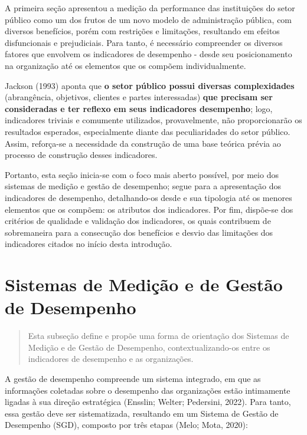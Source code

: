 \documentclass[
  letterpaper,
  DIV=11,
  numbers=noendperiod]{scrreprt}
\begin{document}
A primeira seção apresentou a medição da performance das instituições do
setor público como um dos frutos de um novo modelo de administração
pública, com diversos benefícios, porém com restrições e limitações,
resultando em efeitos disfuncionais e prejudiciais. Para tanto, é
necessário compreender os diversos fatores que envolvem os indicadores
de desempenho - desde seu posicionamento na organização até os elementos
que os compõem individualmente.

Jackson (1993) aponta que \textbf{o setor público possui diversas
complexidades} (abrangência, objetivos, clientes e partes interessadas)
\textbf{que precisam ser consideradas e ter reflexo em seus indicadores
desempenho}; logo, indicadores triviais e comumente utilizados,
provavelmente, não proporcionarão os resultados esperados, especialmente
diante das peculiaridades do setor público. Assim, reforça-se a
necessidade da construção de uma base teórica prévia ao processo de
construção desses indicadores.

Portanto, esta seção inicia-se com o foco mais aberto possível, por meio
dos sistemas de medição e gestão de desempenho; segue para a
apresentação dos indicadores de desempenho, detalhando-os desde e sua
tipologia até os menores elementos que os compõem: os atributos dos
indicadores. Por fim, dispõe-se dos critérios de qualidade e validação
dos indicadores, os quais contribuem de sobremaneira para a consecução
dos benefícios e desvio das limitações dos indicadores citados no início
desta introdução.

\hypertarget{sistemas-de-mediuxe7uxe3o-e-de-gestuxe3o-de-desempenho}{%
\chapter{Sistemas de Medição e de Gestão de
Desempenho}\label{sistemas-de-mediuxe7uxe3o-e-de-gestuxe3o-de-desempenho}}

\begin{quote}
Esta subseção define e propõe uma forma de orientação dos Sistemas de
Medição e de Gestão de Desempenho, contextualizando-os entre os
indicadores de desempenho e as organizações.
\end{quote}

A gestão de desempenho compreende um sistema integrado, em que as
informações coletadas sobre o desempenho das organizações estão
intimamente ligadas à sua direção estratégica (Ensslin; Welter;
Pedersini, 2022). Para tanto, essa gestão deve ser sistematizada,
resultando em um Sistema de Gestão de Desempenho (SGD), composto por
três etapas (Melo; Mota, 2020):
\end{document}
